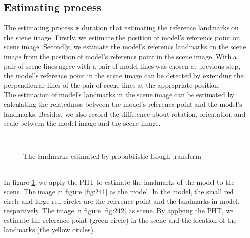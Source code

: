 \subsection{Estimating process}
The estimating process is duration that estimating the reference landmarks on the scene image. Firstly, we estimate the position of model's reference point on scene image. Secondly, we estimate the model's reference landmarks on the scene image from the position of model's reference point in the scene image. With a pair of scene lines agree with a pair of model lines was chosen at previous step, the model's reference point in the scene image can be detected by extending the perpendicular lines of the pair of scene lines at the appropriate position\cite{ashbrook1995robust}.\\[0.2cm]
The estimation of model's landmarks in the scene image can be estimated by calculating the relatedness between the model's reference point and the model's landmarks. Besides, we also record the difference about rotation, orientation and scale between the model image and the scene image.
\begin{figure}[h!]
\centering
{}~~
\caption{The landmarks estimated by probabilistic Hough transform}
\label{fig:24}
\end{figure}~\\
In figure \ref{fig:24}, we apply the PHT to estimate the landmarks of the model to the scene. The image in figure \ref{fig:241} as the model. In the model, the small red circle and large red circles are the reference point and the landmarks in model, respectively. The image in figure \ref{fig:242} as scene. By applying the PHT, we estimate the reference point (green circle) in the scene and the location of the landmarks (the yellow circles).
